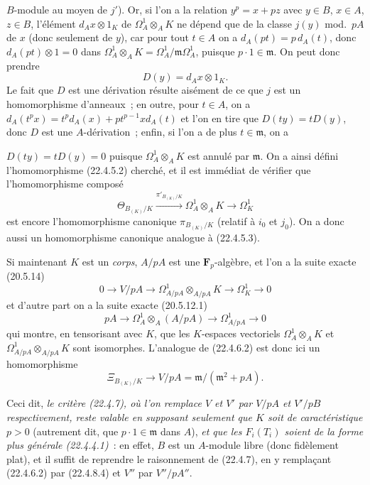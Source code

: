 \begin{remark}[22.4.8]
$B$-module au moyen de $j'$). Or, si l'on a la relation $y^p=x+pz$ avec
$y\in B$, $x\in A$, $z\in B$, l'élément $d_Ax\otimes1_K$ de
$\Omega^1_A\otimes_AK$ ne dépend que de la classe $j(y)$ mod.~$pA$ de $x$
(donc seulement de $y$), car pour tout $t\in A$ on a
$d_A(pt)=p\,d_A(t)$, donc $d_A(pt)\otimes1=0$ dans
$\Omega^1_A\otimes_AK=\Omega^1_A/\mathfrak m\Omega^1_A$, puisque
$p\cdot1\in\mathfrak m$. On peut donc prendre
\[
  D(y)=d_Ax\otimes1_K.
\]
Le fait que $D$ est une dérivation résulte aisément de ce que $j$ est un
homomorphisme d'anneaux~; en outre, pour $t\in A$, on a
$d_A(t^px)=t^p d_A(x)+pt^{p-1}x d_A(t)$ et l'on en tire que
$D(ty)=tD(y)$, donc $D$ est une $A$-dérivation~; enfin, si l'on a de plus
$t\in\mathfrak m$, on a


$D(ty)=tD(y)=0$ puisque $\Omega^1_A\otimes_AK$ est annulé par $\mathfrak m$.
On a ainsi défini l'homomorphisme (22.4.5.2) cherché, et il est immédiat de
vérifier que l'homomorphisme composé
\[
  \Theta_{B_{(K)}/K}\xrightarrow{\pi'_{B_{(K)}/K}}
  \Omega^1_A\otimes_AK\longrightarrow\Omega^1_K
\]
est encore l'homomorphisme canonique $\pi_{B_{(K)}/K}$ (relatif à $i_0$ et
$j_0$). On a donc aussi un homomorphisme canonique analogue à (22.4.5.3).

Si maintenant $K$ est un \emph{corps}, $A/pA$ est une $\mathbf F_p$-algèbre,
et l'on a la suite exacte (20.5.14)
\[
  0\longrightarrow V/pA\longrightarrow
  \Omega^1_{A/pA}\otimes_{A/pA}K\longrightarrow\Omega^1_K\longrightarrow0
\]
et d'autre part on a la suite exacte (20.5.12.1)
\[
  pA\longrightarrow\Omega^1_A\otimes_A(A/pA)
  \longrightarrow\Omega^1_{A/pA}\longrightarrow0
\]
qui montre, en tensorisant avec $K$, que les $K$-espaces vectoriels
$\Omega^1_A\otimes_AK$ et
$\Omega^1_{A/pA}\otimes_{A/pA}K$ sont isomorphes. L'analogue de (22.4.6.2) est
donc ici un homomorphisme
\begin{equation}
\label{0.22.4.8.4-fr}
  \Xi_{B_{(K)}/K}\longrightarrow V/pA=\mathfrak m/(\mathfrak m^2+pA).
  \tag{22.4.8.4}
\end{equation}

Ceci dit, \emph{le critère (22.4.7), où l'on remplace $V$ et $V'$ par $V/pA$
et $V'/pB$ respectivement, reste valable en supposant seulement que $K$ soit
de caractéristique $p>0$} (autrement dit, que $p\cdot1\in\mathfrak m$ dans
$A$), \emph{et que les $F_i(T_i)$ soient de la forme plus générale
(22.4.4.1)}~: en effet, $B$ est un $A$-module libre (donc fidèlement plat), et
il suffit de reprendre le raisonnement de (22.4.7), en y remplaçant (22.4.6.2)
par (22.4.8.4) et $V''$ par $V''/pA''$.
\end{remark}

